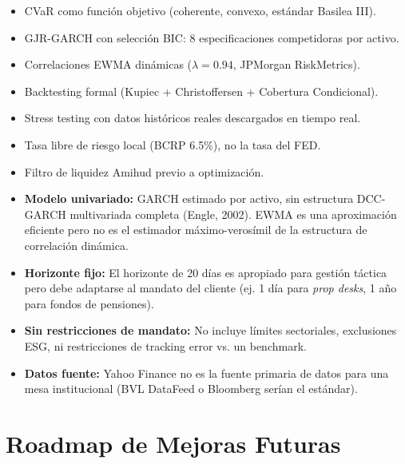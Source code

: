 \documentclass[11pt,a4paper]{article}
\begin{document}
\begin{infobox}[Fortalezas]
\begin{itemize}[leftmargin=*, topsep=0pt]
    \item CVaR como función objetivo (coherente, convexo, estándar Basilea III).
    \item GJR-GARCH con selección BIC: 8 especificaciones competidoras por activo.
    \item Correlaciones EWMA dinámicas ($\lambda=0.94$, JPMorgan RiskMetrics).
    \item Backtesting formal (Kupiec + Christoffersen + Cobertura Condicional).
    \item Stress testing con datos históricos reales descargados en tiempo real.
    \item Tasa libre de riesgo local (BCRP 6.5\%), no la tasa del FED.
    \item Filtro de liquidez Amihud previo a optimización.
\end{itemize}
\end{infobox}

\begin{infobox}
\begin{itemize}[leftmargin=*, topsep=0pt]
    \item \textbf{Modelo univariado:} GARCH estimado por activo, sin estructura DCC-GARCH
    multivariada completa (Engle, 2002). EWMA es una aproximación eficiente pero no es
    el estimador máximo-verosímil de la estructura de correlación dinámica.
    \item \textbf{Horizonte fijo:} El horizonte de 20 días es apropiado para gestión táctica
    pero debe adaptarse al mandato del cliente (ej. 1 día para \textit{prop desks},
    1 año para fondos de pensiones).
    \item \textbf{Sin restricciones de mandato:} No incluye límites sectoriales, exclusiones
    ESG, ni restricciones de tracking error vs. un benchmark.
    \item \textbf{Datos fuente:} Yahoo Finance no es la fuente primaria de datos para
    una mesa institucional (BVL DataFeed o Bloomberg serían el estándar).
\end{itemize}
\end{infobox}

\section{Roadmap de Mejoras Futuras}
\end{document}

